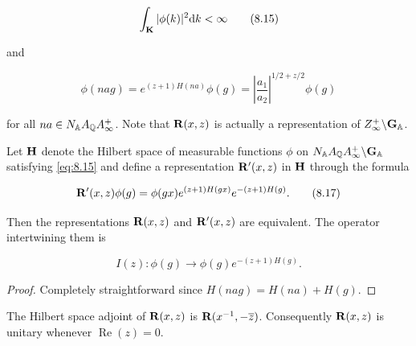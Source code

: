 \begin{equation}\label{eq:8.15}
\int_{\mathbf{K}} |\phi(k)|^{2} \mathrm{d} k < \infty\tag{8.15}
\end{equation}

and

\begin{equation}\label{eq:8.16}
\phi(nag) = e^{(z+1)H(na)}\phi(g) = \left|\frac{a_{1}}{a_{2}}\right|^{1/2 + z/2}\phi(g)\tag{8.16}
\end{equation}

for all $na \in N_{\mathbb{A}}A_{\mathbb{Q}}A_{\infty}^{+}$. Note that $\mathbf{R}(x,z)$ is actually a representation of $Z_{\infty}^{+}\backslash\mathbf{G}_{\mathbb{A}}$.

\begin{lemma}\label{lem:8.1}

Let $\mathbf{H}$ denote the Hilbert space of measurable functions $\phi$ on $N_{\mathbb{A}}A_{\mathbb{Q}}A_{\infty}^{+}\backslash\mathbf{G}_{\mathbb{A}}$ satisfying \eqref{eq:8.15} and define a representation $\mathbf{R}'(x,z)$ in $\mathbf{H}$ through the formula

\begin{equation}\label{eq:8.17}
\mathbf{R}'(x,z)\phi(g) = \phi(gx)e^{(z+1)H(gx)}e^{-(z+1)H(g)}.\tag{8.17}
\end{equation}

Then the representations $\mathbf{R}(x,z)$ and $\mathbf{R}'(x,z)$ are equivalent. The operator intertwining them is

\begin{equation}\label{eq:8.18}
I(z): \phi(g) \to \phi(g)e^{-(z+1)H(g)}.\tag{8.18}
\end{equation}

\end{lemma}

\begin{proof}

Completely straightforward since $H(nag) = H(na) + H(g)$.

\end{proof}

\begin{lemma}\label{lem:8.2}

The Hilbert space adjoint of $\mathbf{R}(x,z)$ is $\mathbf{R}(x^{-1}, -\overline{z})$. Consequently $\mathbf{R}(x,z)$ is unitary whenever $\operatorname{Re}(z) = 0$.

\end{lemma}

